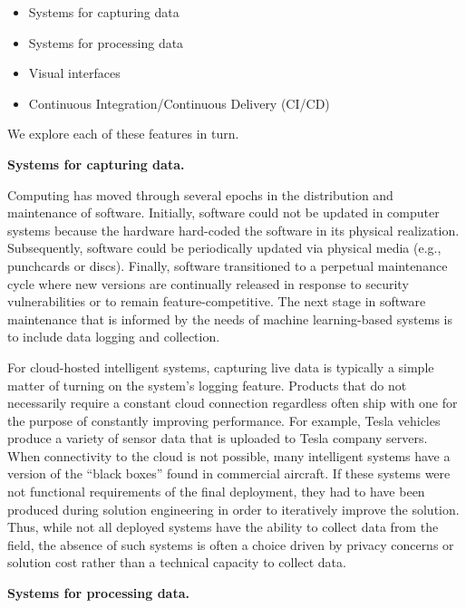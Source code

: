 \begin{itemize}
    \item Systems for capturing data
    \item Systems for processing data
    \item Visual interfaces
    \item Continuous Integration/Continuous Delivery (CI/CD)
\end{itemize}

We explore each of these features in turn.


\textbf{Systems for capturing data.}

Computing has moved through several epochs in the distribution and maintenance of software. Initially, software could not be updated in computer systems because the hardware hard-coded the software in its physical realization. Subsequently, software could be periodically updated via physical media (e.g., punchcards or discs). Finally, software transitioned to a perpetual maintenance cycle where new versions are continually released in response to security vulnerabilities or to remain feature-competitive. The next stage in software maintenance that is informed by the needs of machine learning-based systems is to include data logging and collection.

For cloud-hosted intelligent systems, capturing live data is typically a simple matter of turning on the system's logging feature. Products that do not necessarily require a constant cloud connection regardless often ship with one for the purpose of constantly improving performance. For example, Tesla vehicles produce a variety of sensor data that is uploaded to Tesla company servers. When connectivity to the cloud is not possible, many intelligent systems have a version of the ``black boxes'' found in commercial aircraft. If these systems were not functional requirements of the final deployment, they had to have been produced during solution engineering in order to iteratively improve the solution. Thus, while not all deployed systems have the ability to collect data from the field, the absence of such systems is often a choice driven by privacy concerns or solution cost rather than a technical capacity to collect data.

\textbf{Systems for processing data.}


